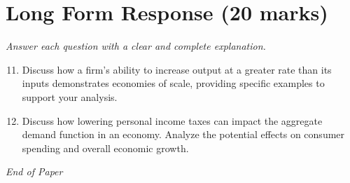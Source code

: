 \documentclass[12pt]{article}
\begin{document}
\section*{Long Form Response (20 marks)}
\textit{Answer each question with a clear and complete explanation.}
\begin{enumerate}[label=\arabic*.]
\setcounter{enumi}{10}
\item Discuss how a firm's ability to increase output at a greater rate than its inputs demonstrates economies of scale, providing specific examples to support your analysis.
\item Discuss how lowering personal income taxes can impact the aggregate demand function in an economy. Analyze the potential effects on consumer spending and overall economic growth.
\end{enumerate}

\vfill
\noindent\textit{End of Paper}
\end{document}
